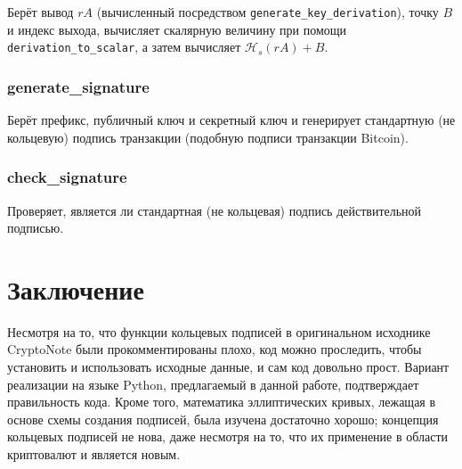 \documentclass{mrl}
\numberwithin{equation}{section}
\numberwithin{figure}{section}
\begin{document}
Берёт вывод $rA$ (вычисленный посредством \texttt{generate\_key\_derivation}), точку $B$ и индекс выхода, вычисляет скалярную величину при помощи \texttt{derivation\_to\_scalar}, а затем вычисляет $\mathcal{H}_{s}\left(rA\right)+B$.

\subsubsection{generate\_signature}

Берёт префикс, публичный ключ и секретный ключ и генерирует стандартную (не кольцевую) подпись транзакции (подобную подписи транзакции Bitcoin).

\subsubsection{check\_signature}

Проверяет, является ли стандартная (не кольцевая) подпись действительной подписью.

\section{Заключение}
Несмотря на то, что функции кольцевых подписей в оригинальном исходнике CryptoNote были прокомментированы плохо, код можно проследить, чтобы установить и использовать исходные данные, и сам код довольно прост. Вариант реализации на языке Python, предлагаемый в данной работе, подтверждает правильность кода. Кроме того, математика эллиптических кривых, лежащая в основе схемы создания подписей, была изучена достаточно хорошо; концепция кольцевых подписей не нова, даже несмотря на то, что их применение в области криптовалют и является новым.

\medskip{}
\end{document}
